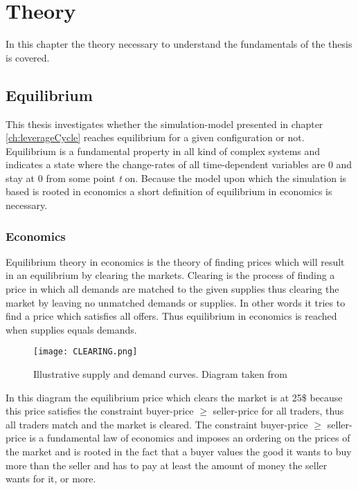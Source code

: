 \documentclass[../Bachelorarbeit.tex]{subfiles}
\begin{document}
\graphicspath{{./figures/theory/}}	%

\chapter{Theory}
\label{ch:theory}

In this chapter the theory necessary to understand the fundamentals of the thesis is covered. 

\section{Equilibrium}
This thesis investigates whether the simulation-model presented in chapter \ref{ch:leverageCycle} reaches equilibrium for a given configuration or not. Equilibrium is a fundamental property in all kind of complex systems and indicates a state where the change-rates of all time-dependent variables are 0 and stay at 0 from some point \textit{t} on. Because the model upon which the simulation is based is rooted in economics a short definition of equilibrium in economics is necessary.

\subsection{Economics}
Equilibrium theory in economics is the theory of finding prices which will result in an equilibrium by clearing the markets. Clearing is the process of finding a price in which all demands are matched to the given supplies thus clearing the market by leaving no unmatched demands or supplies. In other words it tries to find a price which satisfies all offers. Thus equilibrium in economics is reached when supplies equals demands.

\begin{figure}[H]
	\centering
  \texttt{[image: CLEARING.png]}
  	\caption{Illustrative supply and demand curves. Diagram taken from \cite{Parsons2006}}
	\label{fig:CLEARING}
\end{figure}

In this diagram the equilibrium price which clears the market is at 25\$ because this price satisfies the constraint buyer-price $\geq$ seller-price for all traders, thus all traders match and the market is cleared. The constraint buyer-price $\geq$ seller-price is a fundamental law of economics and imposes an ordering on the prices of the market and is rooted in the fact that a buyer values the good it wants to buy more than the seller and has to pay at least the amount of money the seller wants for it, or more. 
\end{document}
